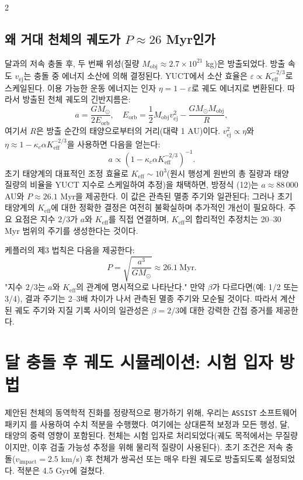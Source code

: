 \documentclass[12pt,a4paper]{article}
\begin{document}
\begin{multicols}{2}
		\subsection{왜 거대 천체의 궤도가 \(P \approx 26\) Myr인가}
		달과의 저속 충돌 후, 두 번째 위성(질량 \(M_{\text{obj}} \approx 2.7\times10^{21}\) kg)은 방출되었다. 방출 속도 \(v_{\text{ej}}\)는 충돌 중 에너지 소산에 의해 결정된다. YUCT에서 소산 효율은 \(\varepsilon \propto K_{\mathrm{eff}}^{-2/3}\)로 스케일된다. 이용 가능한 운동 에너지는 인자 \(\eta = 1 - \varepsilon\)로 궤도 에너지로 변환된다. 따라서 방출된 천체 궤도의 긴반지름은:
		\[
		a = \frac{GM_{\odot}}{2E_{\text{orb}}}, \quad E_{\text{orb}} = \frac{1}{2} M_{\text{obj}} v_{\text{ej}}^2 - \frac{GM_{\odot}M_{\text{obj}}}{R},
		\]
		여기서 \(R\)은 방출 순간의 태양으로부터의 거리(대략 1 AU)이다. \(v_{\text{ej}}^2 \propto \eta\)와 \(\eta \approx 1 - \kappa_c \alpha K_{\mathrm{eff}}^{-2/3}\)을 사용하면 다음을 얻는다:
		\[
		a \propto \left(1 - \kappa_c \alpha K_{\mathrm{eff}}^{-2/3}\right)^{-1}.
		\]
		초기 태양계의 대표적인 조정 효율로 \(K_{\mathrm{eff}} \sim 10^3\)(원시 행성계 원반의 총 질량과 태양 질량의 비율을 YUCT 지수로 스케일하여 추정)을 채택하면, 방정식 (12)는 \(a \approx 88\,000\) AU와 \(P \approx 26.1\) Myr을 제공한다. 이 값은 관측된 멸종 주기와 일관된다; 그러나 초기 태양계의 \(K_{\mathrm{eff}}\)에 대한 정확한 결정은 여전히 불확실하며 추가적인 개선이 필요하다. 주요 요점은 지수 \(2/3\)가 \(a\)와 \(K_{\mathrm{eff}}\)를 직접 연결하며, \(K_{\mathrm{eff}}\)의 합리적인 추정치는 20–30 Myr 범위의 주기를 생성한다는 것이다.
		
		케플러의 제3 법칙은 다음을 제공한다:
		\[
		P = \sqrt{\frac{a^3}{GM_{\odot}}} \approx 26.1\ \text{Myr}.
		\]
		"지수 \(2/3\)는 \(a\)와 \(K_{\mathrm{eff}}\)의 관계에 명시적으로 나타난다." 만약 \(\beta\)가 다르다면(예: 1/2 또는 3/4), 결과 주기는 2–3배 차이가 나서 관측된 멸종 주기와 모순될 것이다. 따라서 계산된 궤도 주기와 지질 기록 사이의 일관성은 \(\beta = 2/3\)에 대한 강력한 간접 증거를 제공한다.
		
		\section{달 충돌 후 궤도 시뮬레이션: 시험 입자 방법}
		제안된 천체의 동역학적 진화를 정량적으로 평가하기 위해, 우리는 \texttt{ASSIST} 소프트웨어 패키지 \cite{Tamayo2020}를 사용하여 수치 적분을 수행했다. 여기에는 상대론적 보정과 모든 행성, 달, 태양의 중력 영향이 포함된다. 천체는 시험 입자로 처리되었다(궤도 목적에서는 무질량이지만, 이후 검출 가능성 추정을 위해 물리적 질량이 사용된다). 초기 조건은 저속 충돌(\(v_{\text{impact}} = 2.5\) km/s) 후 천체가 쌍곡선 또는 매우 타원 궤도로 방출되도록 설정되었다. 적분은 4.5 Gyr에 걸쳤다.
		

\end{multicols}
\end{document}
